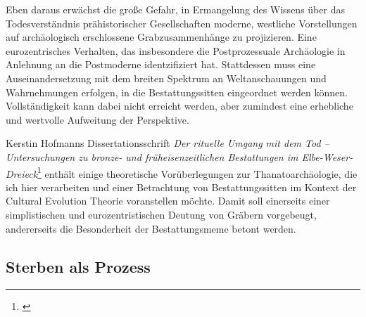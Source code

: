 \documentclass[openany,twoside,twocolumn]{book}
\let\rmarkdownfootnote\footnote%
\def\footnote{\protect\rmarkdownfootnote}
\begin{document}
Eben daraus erwächst die große Gefahr, in Ermangelung des Wissens über
das Todesverständnis prähistorischer Gesellschaften moderne, westliche
Vorstellungen auf archäologisch erschlossene Grabzusammenhänge zu
projizieren. Eine eurozentrisches Verhalten, das insbesondere die
Postprozessuale Archäologie in Anlehnung an die Postmoderne
identzifiziert hat. Stattdessen muss eine Auseinandersetzung mit dem
breiten Spektrum an Weltanschauungen und Wahrnehmungen erfolgen, in die
Bestattungssitten eingeordnet werden können. Vollständigkeit kann dabei
nicht erreicht werden, aber zumindest eine erhebliche und wertvolle
Aufweitung der Perspektive.

Kerstin Hofmanns Dissertationsschrift \emph{Der rituelle Umgang mit dem
Tod -- Untersuchungen zu bronze- und früheisenzeitlichen Bestattungen im
Elbe-Weser-Dreieck}\footnote{\textcite{hofmann_rituelle_2008}} enthält
einige theoretische Vorüberlegungen zur Thanatoarchäologie, die ich hier
verarbeiten und einer Betrachtung von Bestattungssitten im Kontext der
Cultural Evolution Theorie voranstellen möchte. Damit soll einerseits
einer simplistischen und eurozentristischen Deutung von Gräbern
vorgebeugt, andererseits die Besonderheit der Bestattungsmeme betont
werden.

\hypertarget{sterben-als-prozess}{%
\subsection{Sterben als Prozess}\label{sterben-als-prozess}}
\end{document}
